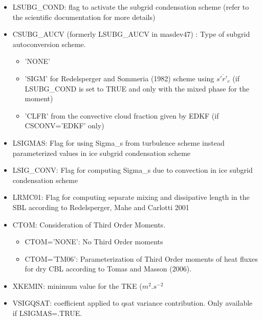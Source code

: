 \begin{itemize}
\item
{}
LSUBG\_COND: flag to activate the subgrid condensation scheme (refer to the scientific 
documentation for more details)

\item
{}
CSUBG\_AUCV (formerly LSUBG\_AUCV in masdev47) : Type of subgrid autoconversion scheme.
\begin{itemize}
\item  'NONE' 
\item 'SIGM' for Redelsperger and Sommeria (1982) scheme using $\overline{s'r'_{c}}$ 
(if LSUBG\_COND
is set to TRUE and only with the mixed phase for the moment)
\item 'CLFR' from the convective cloud fraction given by EDKF 
(if CSCONV='EDKF' only)
\end{itemize}

\item
{}
LSIGMAS: Flag for using Sigma\_s from turbulence scheme instead parameterized values
in ice subgrid condensation scheme

\item
{}
LSIG\_CONV: Flag for computing Sigma\_s due to convection in ice subgrid 
condensation scheme

\item
{}
LRMC01: Flag for computing separate mixing and dissipative length
in the SBL according to Redelsperger, Mahe and Carlotti 2001

\item
{}
CTOM: Consideration of Third Order Moments.

\begin{itemize}
\item
CTOM='NONE': No Third Order moments                             
\item
CTOM='TM06': Parameterization of Third Order moments of heat fluxes for dry CBL
according to Tomas and Masson (2006).
\end{itemize}

\item
{}
XKEMIN: minimum value for the TKE ($m^{2}.s^{-2}$

\item
{}
VSIGQSAT: coefficient applied to qsat variance contribution. Only available if LSIGMAS=.TRUE.

\end{itemize}



